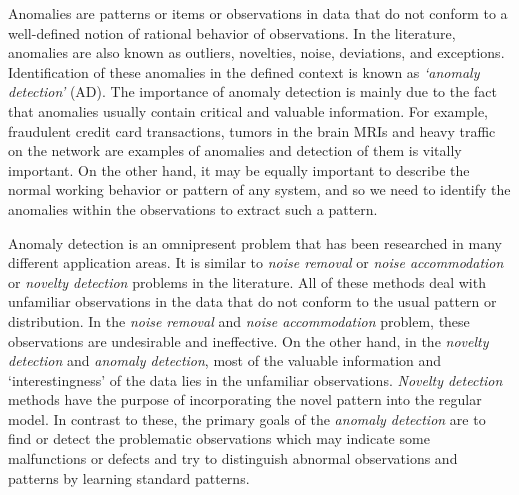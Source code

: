 Anomalies are patterns or items or observations in data that do not conform to a well-defined notion of rational behavior of observations\cite{chandola2009anomaly}. 
In the literature, anomalies are also known as outliers, novelties, noise, deviations, and exceptions\cite{hodge2004survey}.
Identification of these anomalies in the defined context is known as {\it `anomaly detection'} (AD)\cite{mehra1971innovations}.
The importance of anomaly detection is mainly due to the fact that anomalies usually contain critical and valuable information. 
For example, fraudulent credit card transactions\cite{aleskerov1997cardwatch}, tumors in the brain MRIs\cite{spence2001detection} and heavy traffic on the network\cite{barford2002signal} are examples of anomalies and detection of them is vitally important. 
On the other hand, it may be equally important to describe the normal working behavior or pattern of any system, and so we need to identify the anomalies within the observations to extract such a pattern. 

Anomaly detection is an omnipresent problem that has been researched in many different application areas. 
It is similar to {\it noise removal}\cite{teng1990adaptive} or {\it noise accommodation}\cite{rousseeuw2005robust} or {\it novelty detection}\cite{markou2003noveltyA, markou2003noveltyB} problems in the literature. 
All of these methods deal with unfamiliar observations in the data that do not conform to the usual pattern or distribution. 
In the {\it noise removal} and {\it noise accommodation} problem, these observations are undesirable and ineffective. 
On the other hand, in the {\it novelty detection} and {\it anomaly detection}, most of the valuable information and `interestingness' of the data lies in the unfamiliar observations.
{\it Novelty detection} methods have the purpose of incorporating the novel pattern into the regular model.
In contrast to these, the primary goals of the {\it anomaly detection} are to find or detect the problematic observations which may indicate some malfunctions or defects and try to distinguish abnormal observations and patterns by learning standard patterns.

